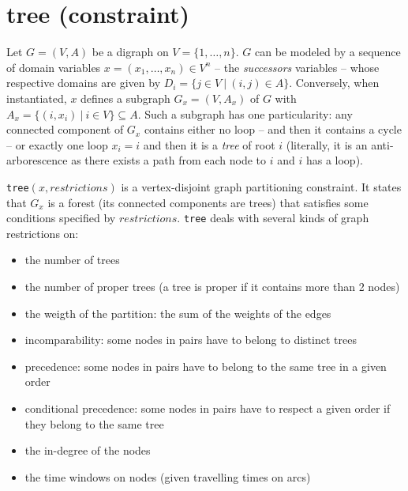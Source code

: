 \label{tree}
\hypertarget{tree}{}

\section{tree (constraint)}\label{tree:treeconstraint}\hypertarget{tree:treeconstraint}{}

Let $G=(V,A)$ be a digraph on $V=\{1,\ldots,n\}$. $G$ can be modeled by a sequence of domain variables $x=(x_1,\dots,x_n)\in V^n$ -- the \emph{successors} variables -- whose respective domains are given by $D_i=\{j\in V\ |\ (i,j)\in A\}$. Conversely, when instantiated, $x$ defines a subgraph $G_x=(V,A_x)$ of $G$ with $A_x=\{(i,x_i)\ |\ i\in V\}\subseteq A$. Such a subgraph has one particularity: any connected component of $G_x$ contains either no loop -- and then it contains a cycle -- or exactly one loop $x_i=i$ and then it is a \emph{tree} of root $i$ (literally, it is an anti-arborescence as there exists a path from each node to $i$ and $i$ has a loop).

\begin{notedef}
  \texttt{tree}$(x,restrictions)$ is a vertex-disjoint graph partitioning constraint. It states that $G_x$ is a forest (its connected components are trees) that satisfies some conditions specified by $restrictions$.
\texttt{tree} deals with several kinds of graph restrictions on:
\begin{itemize}
	\item the number of trees
	\item the number of proper trees (a tree is proper if it contains more than 2 nodes)
    \item the weigth of the partition: the sum of the weights of the edges
	\item incomparability: some nodes in pairs have to belong to distinct trees
	\item precedence: some nodes in pairs have to belong to the same tree in a given order
	\item conditional precedence: some nodes in pairs have to respect a given order if they belong to the same tree
	\item the in-degree of the nodes
	\item the time windows on nodes (given travelling times on arcs)
\end{itemize}
\end{notedef}

